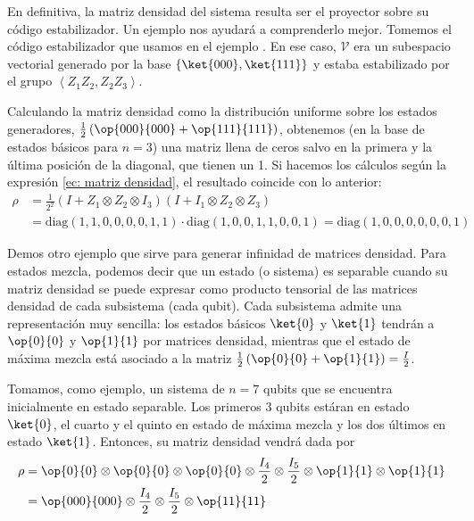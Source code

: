 \documentclass[11pt,a4paper,twoside,pdf]{article}
\numberwithin{equation}{section}
\begin{document}
	En definitiva, la matriz densidad del sistema resulta ser el proyector sobre su código estabilizador. Un ejemplo nos ayudará a comprenderlo mejor. Tomemos el código estabilizador que usamos en el ejemplo . En ese caso, $\mathcal{V}$ era un subespacio vectorial generado por la base $\{\ket{000},\ket{111}\}$ y estaba estabilizado por el grupo $\left\langle Z_1Z_2,Z_2Z_3 \right\rangle $.
	
	Calculando la matriz densidad como la distribución uniforme sobre los estados generadores, $\frac{1}{2}\left( \op{000}{000}+ \op{111}{111}\right)$, obtenemos (en la base de estados básicos para $n=3$) una matriz llena de ceros salvo en la primera y la última posición de la diagonal, que tienen un 1. Si hacemos los cálculos según la expresión \eqref{ec: matriz densidad}, el resultado coincide con lo anterior:
		\begin{equation*}
			\begin{aligned}
				\rho &= \frac{1}{2^2} (I+Z_1 \otimes Z_2 \otimes I_3)(I+I_1 \otimes Z_2 \otimes Z_3)\\
						&= \text{diag}(1,1,0,0,0,0,1,1)\cdot \text{diag}(1,0,0,1,1,0,0,1) = \text{diag}(1,0,0,0,0,0,0,1) 
			\end{aligned}
		\end{equation*}
	
	Demos otro ejemplo que sirve para generar infinidad de matrices densidad. Para estados mezcla, podemos decir que un estado (o sistema) es separable cuando su matriz densidad se puede expresar como producto tensorial de las matrices densidad de cada subsistema (cada qubit). Cada subsistema admite una representación muy sencilla: los estados básicos $\ket{0}$ y $\ket{1}$ tendrán a $\op{0}{0}$ y $\op{1}{1}$ por matrices densidad, mientras que el estado de máxima mezcla está asociado a la matriz $\frac{1}{2}\left( \op{0}{0}+\op{1}{1} \right) =\frac{I}{2}$.
	
	Tomamos, como ejemplo, un sistema de $n=7$ qubits que se encuentra inicialmente en estado separable. Los primeros 3 qubits estáran en estado $\ket{0}$, el cuarto y el quinto en estado de máxima mezcla y los dos últimos en estado $\ket{1}$. Entonces, su matriz densidad vendrá dada por
		\begin{equation*}
			\begin{aligned}
				\rho &= \op{0}{0} \otimes \op{0}{0} \otimes \op{0}{0} \otimes \frac{I_4}{2} \otimes \frac{I_5}{2} \otimes \op{1}{1} \otimes \op{1}{1} \\
				&= \op{000}{000} \otimes \frac{I_4}{2} \otimes \frac{I_5}{2} \otimes \op{11}{11}
			\end{aligned}
		\end{equation*}
	
\end{document}
